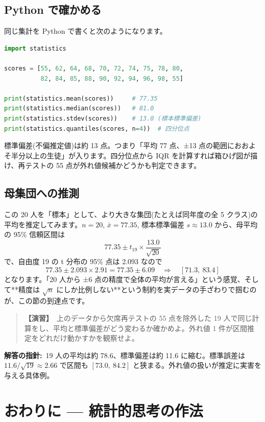 \documentclass{article}
\begin{document}
\subsection{Python で確かめる}

同じ集計を Python で書くと次のようになります。

\begin{lstlisting}[language=Python]
import statistics

scores = [55, 62, 64, 68, 70, 72, 74, 75, 78, 80,
          82, 84, 85, 88, 90, 92, 94, 96, 98, 55]

print(statistics.mean(scores))     # 77.35
print(statistics.median(scores))   # 81.0
print(statistics.stdev(scores))    # 13.0 (標本標準偏差)
print(statistics.quantiles(scores, n=4))  # 四分位点
\end{lstlisting}

標準偏差(不偏推定値)は約 13 点。つまり「平均 77 点、±13 点の範囲におおよそ半分以上の生徒」が入ります。四分位点から IQR を計算すれば箱ひげ図が描け、再テストの 55 点が外れ値候補かどうかも判定できます。

\subsection{母集団への推測}

この 20 人を「標本」として、より大きな集団(たとえば同年度の全 5 クラス)の平均を推定してみます。\(n = 20\), \(\bar{x} = 77.35\), 標本標準偏差 \(s \approx 13.0\) から、母平均の 95\% 信頼区間は
\[ 77.35 \pm t_{19} \times \frac{13.0}{\sqrt{20}} \]
で、自由度 19 の t 分布の 95\% 点は 2.093 なので
\[ 77.35 \pm 2.093 \times 2.91 = 77.35 \pm 6.09 \quad \Rightarrow \quad [71.3,\ 83.4] \]
となります。「20 人から ±6 点の精度で全体の平均が言える」という感覚、そして**精度は \(\sqrt{n}\) にしか比例しない**という制約を実データの手ざわりで掴むのが、この節の到達点です。

\begin{quote}
\textbf{【演習】}\ 上のデータから欠席再テストの 55 点を除外した 19 人で同じ計算をし、平均と標準偏差がどう変わるか確かめよ。外れ値 1 件が区間推定をどれだけ動かすかを観察せよ。
\end{quote}

\textbf{解答の指針:}\ 19 人の平均は約 78.6、標準偏差は約 11.6 に縮む。標準誤差は \(11.6/\sqrt{19} \approx 2.66\) で区間も \([73.0,\ 84.2]\) と狭まる。外れ値の扱いが推定に実害を与える具体例。

\section{おわりに — 統計的思考の作法}
\end{document}
